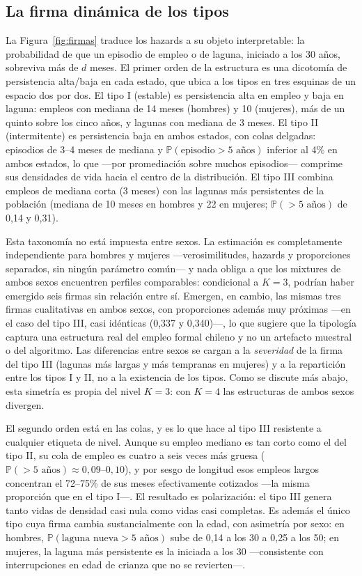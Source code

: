\documentclass[11pt]{article}
\newcommand{\Prob}{\mathbb{P}}
\begin{document}
\subsection{La firma dinámica de los tipos}
\label{sec:firmas}

La Figura~\ref{fig:firmas} traduce los hazards a su objeto interpretable:
la probabilidad de que un episodio de empleo o de laguna, iniciado a los 30
años, sobreviva más de $d$ meses. El primer orden de la estructura es una
dicotomía de persistencia alta/baja en cada estado, que ubica a los tipos
en tres esquinas de un espacio dos por dos. El tipo I (estable) es
persistencia alta en empleo y baja en laguna: empleos con mediana de 14
meses (hombres) y 10 (mujeres), más de un quinto sobre los cinco años, y
lagunas con mediana de 3 meses. El tipo II (intermitente) es persistencia
baja en ambos estados, con colas delgadas: episodios de 3--4 meses de
mediana y $\Prob(\text{episodio} > 5\text{ años})$ inferior al 4\% en ambos
estados, lo que —por promediación sobre muchos episodios— comprime sus
densidades de vida hacia el centro de la distribución. El tipo III combina
empleos de mediana corta (3 meses) con las lagunas más persistentes de la
población (mediana de 10 meses en hombres y 22 en mujeres;
$\Prob(>5\text{ años})$ de 0,14 y 0,31).

Esta taxonomía no está impuesta entre sexos. La estimación es completamente
independiente para hombres y mujeres —verosimilitudes, hazards y
proporciones separados, sin ningún parámetro común— y nada obliga a que los
mixtures de ambos sexos encuentren perfiles comparables: condicional a
$K=3$, podrían haber emergido seis firmas sin relación entre sí. Emergen,
en cambio, las mismas tres firmas cualitativas en ambos sexos, con
proporciones además muy próximas —en el caso del tipo III, casi idénticas
(0,337 y 0,340)—, lo que sugiere que la tipología captura una estructura
real del empleo formal chileno y no un artefacto muestral o del algoritmo.
Las diferencias entre sexos se cargan a la \emph{severidad} de la firma del
tipo III (lagunas más largas y más tempranas en mujeres) y a la repartición
entre los tipos I y II, no a la existencia de los tipos. Como se discute
más abajo, esta simetría es propia del nivel $K=3$: con $K=4$ las
estructuras de ambos sexos divergen.

El segundo orden está en las colas, y es lo que hace al tipo III resistente
a cualquier etiqueta de nivel. Aunque su empleo mediano es tan corto como
el del tipo II, su cola de empleo es cuatro a seis veces más gruesa
($\Prob(>5\text{ años}) \approx 0{,}09$--$0{,}10$), y por sesgo de longitud
esos empleos largos concentran el 72--75\% de sus meses efectivamente
cotizados —la misma proporción que en el tipo I—. El resultado es
polarización: el tipo III genera tanto vidas de densidad casi nula como
vidas casi completas. Es además el único tipo cuya firma cambia
sustancialmente con la edad, con asimetría por sexo: en hombres,
$\Prob(\text{laguna nueva} > 5\text{ años})$ sube de 0,14 a los 30 a 0,25
a los 50; en mujeres, la laguna más persistente es la iniciada a los 30
—consistente con interrupciones en edad de crianza que no se revierten—.
\end{document}
